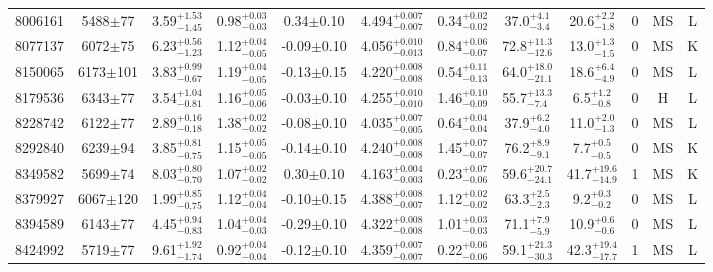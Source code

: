 \begin{landscape}
\begin{longtable}{c|ccccc|ccc|ccc}
	8006161 & 5488$\pm$77    & 3.59$_{-1.45}^{+1.53}$    & 0.98$_{-0.03}^{+0.03}$ & 0.34$\pm$0.10     & 4.494$_{-0.007}^{+0.007}$ & 0.34$_{-0.02}^{+0.02}$ & 37.0$_{-3.4}^{+4.1}$      & 20.6$_{-1.8}^{+2.2}$     & 0 &        MS & L \\
	8077137 & 6072$\pm$75    & 6.23$_{-1.23}^{+0.56}$    & 1.12$_{-0.05}^{+0.04}$ & -0.09$\pm$0.10    & 4.056$_{-0.013}^{+0.010}$ & 0.84$_{-0.07}^{+0.06}$ & 72.8$_{-12.6}^{+11.3}$    & 13.0$_{-1.5}^{+1.3}$     & 0 &        MS & K \\
	8150065 & 6173$\pm$101   & 3.83$_{-0.67}^{+0.99}$    & 1.19$_{-0.05}^{+0.04}$ & -0.13$\pm$0.15    & 4.220$_{-0.008}^{+0.008}$ & 0.54$_{-0.13}^{+0.11}$ & 64.0$_{-21.1}^{+18.0}$    & 18.6$_{-4.9}^{+6.4}$     & 0 &        MS & L \\
	8179536 & 6343$\pm$77    & 3.54$_{-0.81}^{+1.04}$    & 1.16$_{-0.06}^{+0.05}$ & -0.03$\pm$0.10    & 4.255$_{-0.010}^{+0.010}$ & 1.46$_{-0.09}^{+0.10}$ & 55.7$_{-7.4}^{+13.3}$     & 6.5$_{-0.8}^{+1.2}$      & 0 &        H & L \\
	8228742 & 6122$\pm$77    & 2.89$_{-0.18}^{+0.16}$    & 1.38$_{-0.02}^{+0.02}$ & -0.08$\pm$0.10    & 4.035$_{-0.005}^{+0.007}$ & 0.64$_{-0.04}^{+0.04}$ & 37.9$_{-4.0}^{+6.2}$      & 11.0$_{-1.3}^{+2.0}$     & 0 &        MS & L \\
	8292840 & 6239$\pm$94    & 3.85$_{-0.75}^{+0.81}$    & 1.15$_{-0.05}^{+0.05}$ & -0.14$\pm$0.10    & 4.240$_{-0.008}^{+0.008}$ & 1.45$_{-0.07}^{+0.07}$ & 76.2$_{-9.1}^{+8.9}$      & 7.7$_{-0.5}^{+0.5}$      & 0 &        MS & K \\
	8349582 & 5699$\pm$74    & 8.03$_{-0.70}^{+0.80}$    & 1.07$_{-0.02}^{+0.02}$ & 0.30$\pm$0.10     & 4.163$_{-0.003}^{+0.004}$ & 0.23$_{-0.06}^{+0.07}$ & 59.6$_{-24.1}^{+20.7}$    & 41.7$_{-14.9}^{+19.6}$   & 1 &        MS & K \\
	8379927 & 6067$\pm$120   & 1.99$_{-0.75}^{+0.85}$    & 1.12$_{-0.04}^{+0.04}$ & -0.10$\pm$0.15    & 4.388$_{-0.007}^{+0.008}$ & 1.12$_{-0.02}^{+0.02}$ & 63.3$_{-2.3}^{+2.5}$      & 9.2$_{-0.2}^{+0.3}$      & 0 &        MS & L \\
	8394589 & 6143$\pm$77    & 4.45$_{-0.83}^{+0.94}$    & 1.04$_{-0.03}^{+0.04}$ & -0.29$\pm$0.10    & 4.322$_{-0.008}^{+0.008}$ & 1.01$_{-0.03}^{+0.03}$ & 71.1$_{-5.9}^{+7.9}$      & 10.9$_{-0.6}^{+0.6}$     & 0 &        MS & L \\
	8424992 & 5719$\pm$77    & 9.61$_{-1.74}^{+1.92}$    & 0.92$_{-0.04}^{+0.04}$ & -0.12$\pm$0.10    & 4.359$_{-0.007}^{+0.007}$ & 0.22$_{-0.06}^{+0.06}$ & 59.1$_{-30.3}^{+21.3}$    & 42.3$_{-17.7}^{+19.4}$   & 1 &        MS & L \\

\end{longtable}
\end{landscape}
